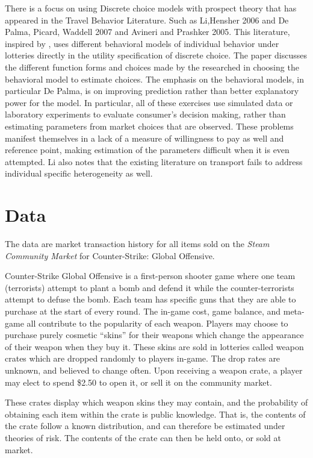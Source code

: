 \documentclass[12pt]{paper}
\begin{document}
There is a focus on using Discrete choice models with prospect theory
that has appeared in the Travel Behavior Literature. Such as
Li,Hensher 2006 and De Palma, Picard, Waddell 2007 and Avineri and
Prashker 2005. This literature, inspired by \cite*{dePalmaEtAl}, uses
different behavioral models of individual behavior under lotteries
directly in the utility specification of discrete choice. The paper
discusses the different function forms and choices made by the
researched in choosing the behavioral model to estimate choices.  The
emphasis on the behavioral models, in particular De Palma, is on
improving prediction rather than better explanatory power for the
model. In particular, all of these exercises use simulated data or
laboratory experiments to evaluate consumer's decision making, rather
than estimating parameters from market choices that are
observed. These problems manifest themselves in a lack of a measure of
willingness to pay as well and reference point, making estimation of
the parameters difficult when it is even attempted. Li also notes that
the existing literature on transport fails to address individual
specific heterogeneity as well.


\section{Data}

The data are market transaction history for all items sold on the
\emph{Steam Community Market} for Counter-Strike: Global
Offensive.

Counter-Strike Global Offensive is a first-person shooter game where
one team (terrorists) attempt to plant a bomb and defend it while the
counter-terrorists attempt to defuse the bomb. Each team has specific
guns that they are able to purchase at the start of every round. The
in-game cost, game balance, and meta-game all contribute to the
popularity of each weapon. Players may choose to purchase purely
cosmetic ``skins'' for their weapons which change the appearance of
their weapon when they buy it. These skins are sold in lotteries
called weapon crates which are dropped randomly to players
in-game. The drop rates are unknown, and believed to change
often. Upon receiving a weapon crate, a player may elect to spend
\$2.50 to open it, or sell it on the community market.

These crates display which weapon skins they may contain, and the
probability of obtaining each item within the crate is public
knowledge. That is, the contents of the crate follow a known
distribution, and can therefore be estimated under theories of
risk. The contents of the crate can then be held onto, or sold at
market.
 
\end{document}
